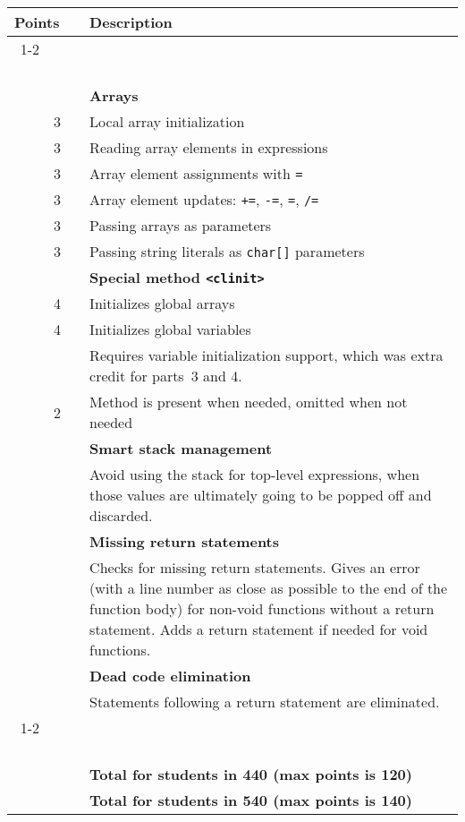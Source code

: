 \documentclass{article}
\makeatletter
\newcommand{\gradeline}{ \cline{1-2} \cline{4-4} ~\\[-1.5ex] }
\newenvironment{gradetable}{\begin{longtable}{@{~~}rrcp{5in}} \multicolumn{2}{l}{\bf Points} & & {\bf Description}\\ \gradeline}{\end{longtable}}
\newcommand{\mainitem}[2]{\pagebreak[2] {\bf #1} &&& {\bf #2}}
\newcommand{\mainpara}[1]{~ &&& {#1} }
\newcommand{\inneritem}[2]{~ & #1 && #2}
\newcommand{\innerpara}[1]{~ & ~ && #1}
\newcommand{\parser}{3}
\newcommand{\typecheck}{4}
\makeatother
\begin{document}
\begin{gradetable}
  \mainitem{18}{Arrays}
  \\[1mm]
  \inneritem{3}{Local array initialization}
  \\[1mm]
  \inneritem{3}{Reading array elements in expressions}
  \\[1mm]
  \inneritem{3}{Array element assignments with {\tt =}}
  \\[1mm]
  \inneritem{3}{Array element updates: {\tt +=}, {\tt -=}, {\tt *=}, {\tt /=}}
  \\[1mm]
  \inneritem{3}{Passing arrays as parameters}
  \\[1mm]
  \inneritem{3}{Passing string literals as {\tt char[]} parameters}
  \\[4mm]

  \mainitem{10}{Special method {\tt <clinit>}}
  \\[1mm]
  \inneritem{4}{Initializes global arrays}
  \\[1mm]
  \inneritem{4}{Initializes global variables}
  \\
  \innerpara{%
    Requires variable initialization support,
    which was extra credit for parts~\parser{} and \typecheck{}.
  }
  \\[1mm]
  \inneritem{2}{Method is present when needed, omitted when not needed}
  \\[4mm]

  \mainitem{4}{Smart stack management}
  \\[1mm]
  \mainpara{%
    Avoid using the stack for top-level expressions,
    when those values are ultimately going to be popped off
    and discarded.
  }
  \\[4mm]

  \mainitem{4}{Missing return statements}
  \\[1mm]
  \mainpara{%
    Checks for missing return statements.
    Gives an error (with a line number as close as possible
    to the end of the function body) for non-void functions
    without a return statement.
    Adds a return statement if needed for void functions.
  }
  \\[4mm]

  \mainitem{4}{Dead code elimination}
  \\[1mm]
  \mainpara{%
    Statements following a return statement
    are eliminated.
  }
  \\[4mm]

  \gradeline
  \mainitem{100}{Total for students in 440 (max points is 120)}
  \\
  \mainitem{120}{Total for students in 540 (max points is 140)}
\end{gradetable}
\end{document}
